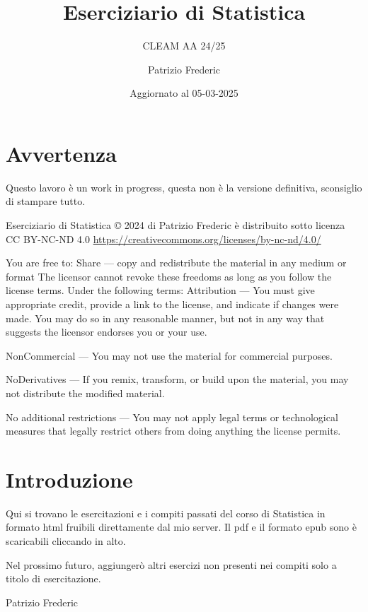 \documentclass[
  11pt,
]{book}
\title{Eserciziario di Statistica}
\subtitle{CLEAM AA 24/25}
\author{Patrizio Frederic}
\date{Aggiornato al 05-03-2025}
\theoremstyle{mytheoremstyle}
\theoremstyle{mydefstyle}
\begin{document}
\maketitle

{
\setcounter{tocdepth}{1}
\tableofcontents
}
\chapter*{Avvertenza}\label{avvertenza}

\large

Questo lavoro è un work in progress, questa non è la versione definitiva, sconsiglio di stampare tutto.

\normalsize

Eserciziario di Statistica © 2024 di Patrizio Frederic è distribuito
sotto licenza CC BY-NC-ND 4.0
\url{https://creativecommons.org/licenses/by-nc-nd/4.0/}

You are free to:
Share --- copy and redistribute the material in any medium or format
The licensor cannot revoke these freedoms as long as you follow the license terms.
Under the following terms:
Attribution --- You must give appropriate credit, provide a link to the license, and indicate if changes were made. You may do so in any reasonable manner, but not in any way that suggests the licensor endorses you or your use.

NonCommercial --- You may not use the material for commercial purposes.

NoDerivatives --- If you remix, transform, or build upon the material, you may not distribute the modified material.

No additional restrictions --- You may not apply legal terms or technological measures that legally restrict others from doing anything the license permits.

\chapter*{Introduzione}\label{introduzione}

Qui si trovano le esercitazioni e i compiti passati del corso di Statistica
in formato html fruibili direttamente dal mio server.
Il pdf e il formato epub sono è scaricabili cliccando in alto.

Nel prossimo futuro, aggiungerò altri esercizi non presenti nei compiti solo a titolo
di esercitazione.

Patrizio Frederic
\end{document}
